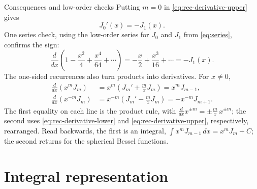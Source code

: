 \documentclass[11pt]{beamer}
\begin{document}
\begin{frame}[allowframebreaks=1.00]{Consequences and low-order checks}
\footnotesize
Putting $m=0$ in \eqref{eq:rec-derivative-upper} gives
\begin{equation}
 J_0'(x)=-J_1(x).
 \label{eq:J0-prime}
\end{equation}
One series check, using the low-order series for $J_0$ and $J_1$ from \eqref{eq:series}, confirms the sign:
\[
 \frac{d}{dx}\left(1-\frac{x^2}{4}+\frac{x^4}{64}+\cdots\right)
 =-\frac x2+\frac{x^3}{16}+\cdots=-J_1(x).
\]
The one-sided recurrences also turn products into derivatives. For $x\ne0$,
\begin{align}
 \frac{d}{dx}(x^mJ_m)
 &=x^m\left(J_m'+\frac m xJ_m\right)
 =x^mJ_{m-1},\label{eq:product-rec-lower}\\
 \frac{d}{dx}(x^{-m}J_m)
 &=x^{-m}\left(J_m'-\frac m xJ_m\right)
 =-x^{-m}J_{m+1}.\label{eq:product-rec-upper}
\end{align}
The first equality on each line is the product rule, with $\frac{d}{dx}x^{\pm m}=\pm\frac mx\,x^{\pm m}$; the second uses
\eqref{eq:rec-derivative-lower} and \eqref{eq:rec-derivative-upper}, respectively, rearranged.
Read backwards, the first is an integral, $\int x^mJ_{m-1}\,dx=x^mJ_m+C$; the second returns
for the spherical Bessel functions.
\end{frame}

\section{Integral representation}\label{sec:int-rep}
\end{document}
